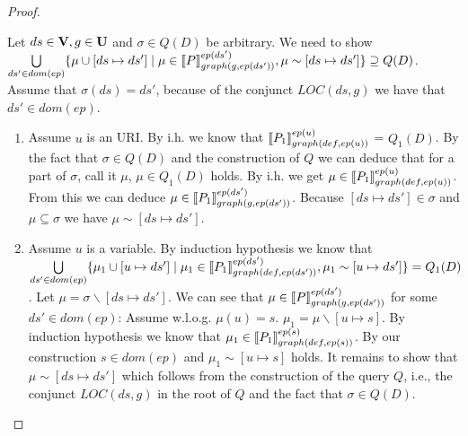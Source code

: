 \begin{proof}
\begin{enumerate}
			\bigskip\noindent
			Let $ds \in \mathbf{V}, g \in \mathbf{U}$ and $\sigma \in Q(D)$ be arbitrary.
			We need to show  $\bigcup\limits_{ds' \in dom(ep)} \{ \mu \cup [ds
				\mapsto ds'] \mid \mu \in
				\llbracket P\rrbracket^{ep(ds')}_{graph(g,ep(ds'))}, \mu \sim
			[ds \mapsto ds'] \}  \supseteq Q(D) $.
			Assume that $\sigma(ds) = ds'$, because of the conjunct $LOC(ds,g)$
			we have that $ds' \in dom(ep)$.
			\begin{enumerate}
				\item Assume $u$ is an URI. 
					By i.h. we know that 
					$\llbracket P_1 \rrbracket^{ep(u)}_{graph(def,ep(u))}$ =
					$Q_1(D)$. By the fact that $\sigma \in Q(D)$ and the
					construction of $Q$ we can deduce that for a part of $\sigma$,
					call it $\mu$, $\mu \in Q_1(D)$ holds. By i.h. we get
					$\mu \in  \llbracket P_1 \rrbracket^{ep(u)}_{graph(def,ep(u))}$.
					From this we can deduce $\mu \in  \llbracket P_1
					\rrbracket^{ep(ds')}_{graph(g,ep(ds'))}$. Because $[ds \mapsto
					ds'] \in \sigma$ and $\mu \subseteq \sigma$ we have $\mu
					\sim [ ds \mapsto ds']$.

				\item Assume $u$ is a variable. By induction hypothesis we
					know that  $\bigcup\limits_{ds' \in dom(ep)} \{ \mu_1 \cup [u
						\mapsto ds'] \mid \mu_1 \in
						\llbracket P_1\rrbracket^{ep(ds')}_{graph(def,ep(ds'))},
					\mu_1 \sim [u\mapsto ds'] \}  = Q_1(D)$.
					Let $\mu = \sigma \backslash [ds \mapsto ds']$. 
					We can see that $\mu \in \llbracket P
					\rrbracket^{ep(ds')}_{graph(g,ep(ds'))}$ for some $ds' \in dom(ep)$:
					Assume w.l.o.g. $\mu(u) = s$.
					$\mu_1 = \mu \backslash [u \mapsto s]$. By induction hypothesis we know
					that $\mu_1 \in \llbracket P_1 \rrbracket^{ep(s)}_{graph(def,ep(s))}$. By our
					construction $s \in dom(ep)$ and $\mu_1 \sim
					[u \mapsto s]$ holds. It remains to show that $\mu \sim
					[ds \mapsto ds']$
					which follows from the construction of the query $Q$, i.e., the conjunct
					$LOC(ds,g)$ in the root of $Q$ and the fact that $\sigma \in Q(D)$.
			\end{enumerate}


\end{enumerate}
\end{proof}
